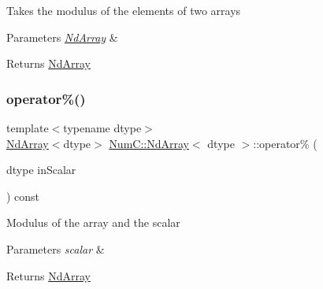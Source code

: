 Takes the modulus of the elements of two arrays


\begin{DoxyParams}{Parameters}
{\em \mbox{\hyperlink{class_num_c_1_1_nd_array}{Nd\+Array}}} & \\
\hline
\end{DoxyParams}
\begin{DoxyReturn}{Returns}
\mbox{\hyperlink{class_num_c_1_1_nd_array}{Nd\+Array}} 
\end{DoxyReturn}
\mbox{\label{class_num_c_1_1_nd_array_aee3b7ea06ffb551d43f29c81de60e8fc}} 
\subsubsection{\texorpdfstring{operator\%()}{operator\%()}\hspace{0.1cm}{\footnotesize\ttfamily [2/2]}}
{\footnotesize\ttfamily template$<$typename dtype$>$ \\
\mbox{\hyperlink{class_num_c_1_1_nd_array}{Nd\+Array}}$<$dtype$>$ \mbox{\hyperlink{class_num_c_1_1_nd_array}{Num\+C\+::\+Nd\+Array}}$<$ dtype $>$\+::operator\% (\begin{DoxyParamCaption}\item[{dtype}]{in\+Scalar }\end{DoxyParamCaption}) const\hspace{0.3cm}{\ttfamily [inline]}}

Modulus of the array and the scalar


\begin{DoxyParams}{Parameters}
{\em scalar} & \\
\hline
\end{DoxyParams}
\begin{DoxyReturn}{Returns}
\mbox{\hyperlink{class_num_c_1_1_nd_array}{Nd\+Array}} 
\end{DoxyReturn}
\mbox{\label{class_num_c_1_1_nd_array_a4d0842ab19ac2b3e65b28499cccc1607}} 
